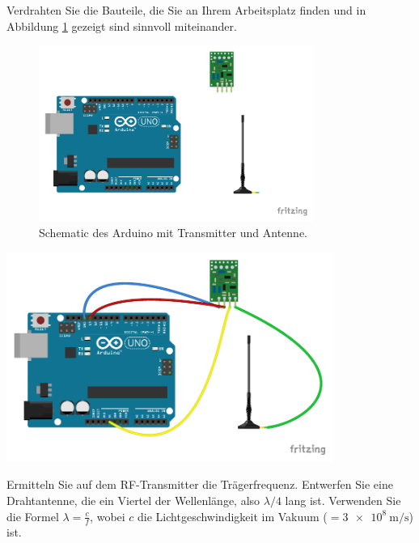 \begin{aufgabe}
    Verdrahten Sie die Bauteile, die Sie an Ihrem Arbeitsplatz finden und in Abbildung \ref{fig:arduino_433_schematic_skript} gezeigt sind sinnvoll miteinander.
\end{aufgabe}


\begin{figure}[H]
\centering
\includegraphics[width=0.8\textwidth]{images/Arduino_433_Sketch_Skript.pdf}
\caption{Schematic des Arduino mit Transmitter und Antenne.}
\label{fig:arduino_433_schematic_skript}
\end{figure}

\begin{lösung}

    \centering
    \includegraphics[width=0.8\textwidth]{images/Arduino_433_Sketch.pdf}
\end{lösung}


\begin{aufgabe}
Ermitteln Sie auf dem RF-Transmitter die Trägerfrequenz. Entwerfen Sie eine Drahtantenne, die ein Viertel der Wellenlänge, also $\lambda/4$ lang ist. Verwenden Sie die Formel $\lambda = \frac{c}{f}$, wobei $c$ die Lichtgeschwindigkeit im Vakuum ($=\SI{3e8}{\meter\per\second}$) ist.
\end{aufgabe}


